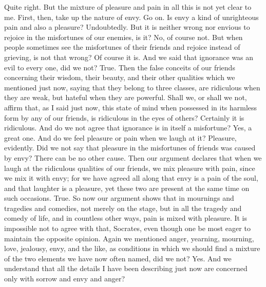 \documentclass[letterpaper,12pt]{article}
\newcommand{\stephpag}[1]{\marginnote{\small\itshape\fontfamily{ppl}\selectfont #1}}
\begin{document}
\begin{drama}
\protarchusspeaks
Quite right. But the mixture of pleasure and pain in all this is not yet clear to me.
\socratesspeaks
First, then, take up the nature of envy.
\protarchusspeaks
Go on. \stephpag{d}
\socratesspeaks
Is envy a kind of unrighteous pain and also a pleasure?
\protarchusspeaks
Undoubtedly.
\socratesspeaks
But it is neither wrong nor envious to rejoice in the misfortunes of our enemies, is it?
\protarchusspeaks
No, of course not.
\socratesspeaks
But when people sometimes see the misfortunes of their friends and rejoice instead of grieving, is not that wrong?
\protarchusspeaks
Of course it is.
\socratesspeaks
And we said that ignorance was an evil to every one, did we not?
\protarchusspeaks
True.
\socratesspeaks
Then the false conceits of our friends concerning their wisdom, their beauty, \stephpag{e} and their other qualities which we mentioned just now, saying that they belong to three classes, are ridiculous when they are weak, but hateful when they are powerful. Shall we, or shall we not, affirm that, as I said just now, this state of mind when possessed in its harmless form by any of our friends, is ridiculous in the eyes of others?
\protarchusspeaks
Certainly it is ridiculous.
\socratesspeaks
And do we not agree that ignorance is in itself a misfortune?
\protarchusspeaks
Yes, a great one.
\socratesspeaks
And do we feel pleasure or pain when we laugh at it? \stephpag{50 a}
\protarchusspeaks
Pleasure, evidently.
\socratesspeaks
Did we not say that pleasure in the misfortunes of friends was caused by envy?
\protarchusspeaks
There can be no other cause.
\socratesspeaks
Then our argument declares that when we laugh at the ridiculous qualities of our friends, we mix pleasure with pain, since we mix it with envy; for we have agreed all along that envy is a pain of the soul, and that laughter is a pleasure, yet these two are present at the same time on such occasions.
\protarchusspeaks
True. \stephpag{b}
\socratesspeaks
So now our argument shows that in mournings and tragedies and comedies, not merely on the stage, but in all the tragedy and comedy of life, and in countless other ways, pain is mixed with pleasure.
\protarchusspeaks
It is impossible not to agree with that, Socrates, even though one be most eager to maintain the opposite opinion.
\socratesspeaks
Again we mentioned anger, yearning, mourning, love, jealousy, envy, and the like, \stephpag{c} as conditions in which we should find a mixture of the two elements we have now often named, did we not?
\protarchusspeaks
Yes.
\socratesspeaks
And we understand that all the details I have been describing just now are concerned only with sorrow and envy and anger?

\end{drama}
\end{document}
